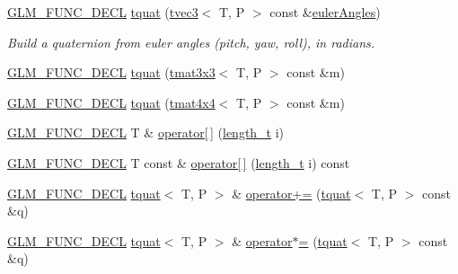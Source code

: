 \begin{DoxyCompactItemize}
\hyperlink{setup_8hpp_ab2d052de21a70539923e9bcbf6e83a51}{G\+L\+M\+\_\+\+F\+U\+N\+C\+\_\+\+D\+E\+CL} \hyperlink{structglm_1_1detail_1_1tquat_acfc1714febec517f5313a91c3ae2e687}{tquat} (\hyperlink{structglm_1_1detail_1_1tvec3}{tvec3}$<$ T, P $>$ const \&\hyperlink{group__gtc__quaternion_gade4034f49ccadf63cb31a7fb5fa3c8aa}{euler\+Angles})
\begin{DoxyCompactList}\small\item\em Build a quaternion from euler angles (pitch, yaw, roll), in radians. \end{DoxyCompactList}\item 
\hyperlink{setup_8hpp_ab2d052de21a70539923e9bcbf6e83a51}{G\+L\+M\+\_\+\+F\+U\+N\+C\+\_\+\+D\+E\+CL} \hyperlink{structglm_1_1detail_1_1tquat_a84d40b0f5ab95f1e5ce01596c909fa25}{tquat} (\hyperlink{structglm_1_1detail_1_1tmat3x3}{tmat3x3}$<$ T, P $>$ const \&m)
\item 
\hyperlink{setup_8hpp_ab2d052de21a70539923e9bcbf6e83a51}{G\+L\+M\+\_\+\+F\+U\+N\+C\+\_\+\+D\+E\+CL} \hyperlink{structglm_1_1detail_1_1tquat_ad880a08dccbc297944a24204640c516d}{tquat} (\hyperlink{structglm_1_1detail_1_1tmat4x4}{tmat4x4}$<$ T, P $>$ const \&m)
\item 
\hyperlink{setup_8hpp_ab2d052de21a70539923e9bcbf6e83a51}{G\+L\+M\+\_\+\+F\+U\+N\+C\+\_\+\+D\+E\+CL} T \& \hyperlink{structglm_1_1detail_1_1tquat_ad4f23768ca2296f8e0f140a5f03cd404}{operator\mbox{[}$\,$\mbox{]}} (\hyperlink{namespaceglm_a090a0de2260835bee80e71a702492ed9}{length\+\_\+t} i)
\item 
\hyperlink{setup_8hpp_ab2d052de21a70539923e9bcbf6e83a51}{G\+L\+M\+\_\+\+F\+U\+N\+C\+\_\+\+D\+E\+CL} T const  \& \hyperlink{structglm_1_1detail_1_1tquat_a7937f407f2db9ab422b7a23e30a88b6f}{operator\mbox{[}$\,$\mbox{]}} (\hyperlink{namespaceglm_a090a0de2260835bee80e71a702492ed9}{length\+\_\+t} i) const
\item 
\hyperlink{setup_8hpp_ab2d052de21a70539923e9bcbf6e83a51}{G\+L\+M\+\_\+\+F\+U\+N\+C\+\_\+\+D\+E\+CL} \hyperlink{structglm_1_1detail_1_1tquat}{tquat}$<$ T, P $>$ \& \hyperlink{structglm_1_1detail_1_1tquat_af711fbfb41fee281c93d990afa15f01e}{operator+=} (\hyperlink{structglm_1_1detail_1_1tquat}{tquat}$<$ T, P $>$ const \&q)
\item 
\hyperlink{setup_8hpp_ab2d052de21a70539923e9bcbf6e83a51}{G\+L\+M\+\_\+\+F\+U\+N\+C\+\_\+\+D\+E\+CL} \hyperlink{structglm_1_1detail_1_1tquat}{tquat}$<$ T, P $>$ \& \hyperlink{structglm_1_1detail_1_1tquat_a243cc89ef80ff3d0a9fd85fc3038587e}{operator$\ast$=} (\hyperlink{structglm_1_1detail_1_1tquat}{tquat}$<$ T, P $>$ const \&q)

\end{DoxyCompactItemize}

